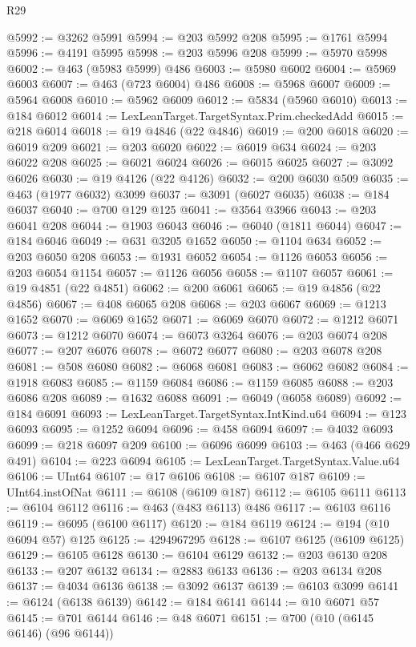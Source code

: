 \begin{lexlean}{R29}
\begin{coremodule}
@5992 := @3262 @5991
@5994 := @203 @5992 @208
@5995 := @1761 @5994
@5996 := @4191 @5995
@5998 := @203 @5996 @208
@5999 := @5970 @5998
@6002 := @463 (@5983 @5999) @486
@6003 := @5980 @6002
@6004 := @5969 @6003
@6007 := @463 (@723 @6004) @486
@6008 := @5968 @6007
@6009 := @5964 @6008
@6010 := @5962 @6009
@6012 := @5834 (@5960 @6010)
@6013 := @184 @6012
@6014 := LexLeanTarget.TargetSyntax.Prim.checkedAdd
@6015 := @218 @6014
@6018 := @19 @4846 (@22 @4846)
@6019 := @200 @6018
@6020 := @6019 @209
@6021 := @203 @6020
@6022 := @6019 @634
@6024 := @203 @6022 @208
@6025 := @6021 @6024
@6026 := @6015 @6025
@6027 := @3092 @6026
@6030 := @19 @4126 (@22 @4126)
@6032 := @200 @6030 @509
@6035 := @463 (@1977 @6032) @3099
@6037 := @3091 (@6027 @6035)
@6038 := @184 @6037
@6040 := @700 @129 @125
@6041 := @3564 @3966
@6043 := @203 @6041 @208
@6044 := @1903 @6043
@6046 := @6040 (@1811 @6044)
@6047 := @184 @6046
@6049 := @631 @3205 @1652
@6050 := @1104 @634
@6052 := @203 @6050 @208
@6053 := @1931 @6052
@6054 := @1126 @6053
@6056 := @203 @6054 @1154
@6057 := @1126 @6056
@6058 := @1107 @6057
@6061 := @19 @4851 (@22 @4851)
@6062 := @200 @6061
@6065 := @19 @4856 (@22 @4856)
@6067 := @408 @6065 @208
@6068 := @203 @6067
@6069 := @1213 @1652
@6070 := @6069 @1652
@6071 := @6069 @6070
@6072 := @1212 @6071
@6073 := @1212 @6070
@6074 := @6073 @3264
@6076 := @203 @6074 @208
@6077 := @207 @6076
@6078 := @6072 @6077
@6080 := @203 @6078 @208
@6081 := @508 @6080
@6082 := @6068 @6081
@6083 := @6062 @6082
@6084 := @1918 @6083
@6085 := @1159 @6084
@6086 := @1159 @6085
@6088 := @203 @6086 @208
@6089 := @1632 @6088
@6091 := @6049 (@6058 @6089)
@6092 := @184 @6091
@6093 := LexLeanTarget.TargetSyntax.IntKind.u64
@6094 := @123 @6093
@6095 := @1252 @6094
@6096 := @458 @6094
@6097 := @4032 @6093
@6099 := @218 @6097 @209
@6100 := @6096 @6099
@6103 := @463 (@466 @629 @491)
@6104 := @223 @6094
@6105 := LexLeanTarget.TargetSyntax.Value.u64
@6106 := UInt64
@6107 := @17 @6106
@6108 := @6107 @187
@6109 := UInt64.instOfNat
@6111 := @6108 (@6109 @187)
@6112 := @6105 @6111
@6113 := @6104 @6112
@6116 := @463 (@483 @6113) @486
@6117 := @6103 @6116
@6119 := @6095 (@6100 @6117)
@6120 := @184 @6119
@6124 := @194 (@10 @6094 @57) @125
@6125 := 4294967295
@6128 := @6107 @6125 (@6109 @6125)
@6129 := @6105 @6128
@6130 := @6104 @6129
@6132 := @203 @6130 @208
@6133 := @207 @6132
@6134 := @2883 @6133
@6136 := @203 @6134 @208
@6137 := @4034 @6136
@6138 := @3092 @6137
@6139 := @6103 @3099
@6141 := @6124 (@6138 @6139)
@6142 := @184 @6141
@6144 := @10 @6071 @57
@6145 := @701 @6144
@6146 := @48 @6071
@6151 := @700 (@10 (@6145 @6146) (@96 @6144))

\end{coremodule}
\end{lexlean}
